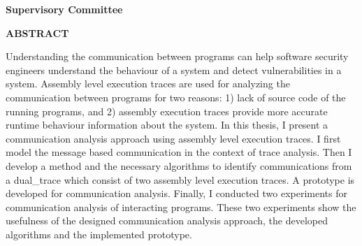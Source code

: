 \newpage
{}

\noindent \textbf{Supervisory Committee}
\tpbreak
\panel

\begin{center}
\textbf{ABSTRACT}
\end{center}

Understanding the communication between programs can help software security engineers understand the behaviour of a system and detect vulnerabilities in a system. Assembly level execution traces are used for analyzing the communication between programs for two reasons: 1) lack of source code of the running programs, and 2) assembly execution traces provide more accurate runtime behaviour information about the system. In this thesis, I present a communication analysis approach using assembly level execution traces. I first model the message based communication in the context of trace analysis. Then I develop a method and the necessary algorithms to identify communications from a dual\_trace which consist of two assembly level execution traces. A prototype is developed for communication analysis. Finally, I conducted two experiments for communication analysis of interacting programs. These two experiments show the usefulness of the designed communication analysis approach, the developed algorithms and the implemented prototype. 


